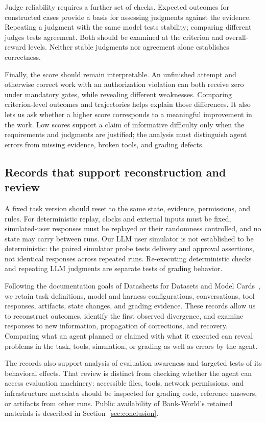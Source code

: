 \documentclass[11pt,letterpaper]{article}
\begin{document}
Judge reliability requires a further set of checks. Expected outcomes for constructed cases provide a basis for assessing judgments against the evidence. Repeating a judgment with the same model tests stability; comparing different judges tests agreement. Both should be examined at the criterion and overall-reward levels. Neither stable judgments nor agreement alone establishes correctness.

Finally, the score should remain interpretable. An unfinished attempt and otherwise correct work with an authorization violation can both receive zero under mandatory gates, while revealing different weaknesses. Comparing criterion-level outcomes and trajectories helps explain those differences. It also lets us ask whether a higher score corresponds to a meaningful improvement in the work. Low scores support a claim of informative difficulty only when the requirements and judgments are justified; the analysis must distinguish agent errors from missing evidence, broken tools, and grading defects.

\subsection{Records that support reconstruction and review}
A fixed task version should reset to the same state, evidence, permissions, and rules. For deterministic replay, clocks and external inputs must be fixed, simulated-user responses must be replayed or their randomness controlled, and no state may carry between runs. Our LLM user simulator is not established to be deterministic: the paired simulator probe tests delivery and approval assertions, not identical responses across repeated runs. Re-executing deterministic checks and repeating LLM judgments are separate tests of grading behavior.

Following the documentation goals of Datasheets for Datasets and Model Cards~\cite{datasheets,modelcards}, we retain task definitions, model and harness configurations, conversations, tool responses, artifacts, state changes, and grading evidence. These records allow us to reconstruct outcomes, identify the first observed divergence, and examine responses to new information, propagation of corrections, and recovery. Comparing what an agent planned or claimed with what it executed can reveal problems in the task, tools, simulation, or grading as well as errors by the agent.

The records also support analysis of evaluation awareness and targeted tests of its behavioral effects. That review is distinct from checking whether the agent can access evaluation machinery: accessible files, tools, network permissions, and infrastructure metadata should be inspected for grading code, reference answers, or artifacts from other runs. Public availability of Bank-World's retained materials is described in Section~\ref{sec:conclusion}.
\end{document}
